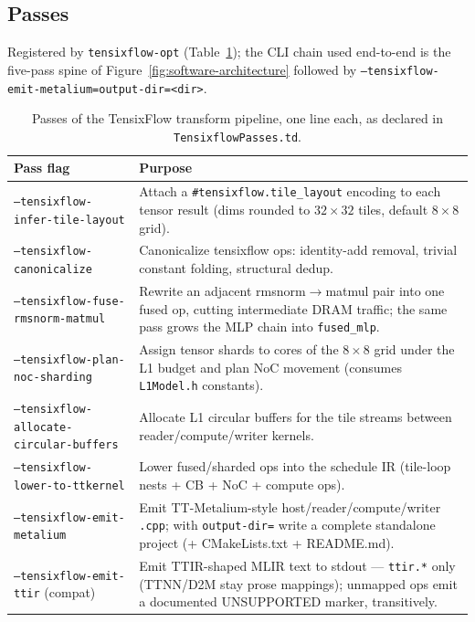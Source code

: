 \subsection{Passes}

Registered by \texttt{tensixflow-opt} (Table~\ref{tab:software-passes}); the
CLI chain used end-to-end is the five-pass spine of
Figure~\ref{fig:software-architecture} followed by
\texttt{--tensixflow-emit-metalium=output-dir=<dir>}.

\begin{table}[htbp]
  \centering
  \caption{Passes of the TensixFlow transform pipeline, one line each, as
  declared in \texttt{TensixflowPasses.td}.}
  \label{tab:software-passes}
  \small
  \begin{tabular}{@{}p{5.4cm}p{9.7cm}@{}}
    \toprule
    \textbf{Pass flag} & \textbf{Purpose} \\
    \midrule
    \texttt{--tensixflow-infer-tile-layout} & Attach a \texttt{\#tensixflow.tile\_layout} encoding to each tensor result (dims rounded to $32\times32$ tiles, default $8\times8$ grid). \\
    \texttt{--tensixflow-canonicalize} & Canonicalize tensixflow ops: identity-add removal, trivial constant folding, structural dedup. \\
    \texttt{--tensixflow-fuse-rmsnorm-matmul} & Rewrite an adjacent rmsnorm$\to$matmul pair into one fused op, cutting intermediate DRAM traffic; the same pass grows the MLP chain into \texttt{fused\_mlp}. \\
    \texttt{--tensixflow-plan-noc-sharding} & Assign tensor shards to cores of the $8\times8$ grid under the L1 budget and plan NoC movement (consumes \texttt{L1Model.h} constants). \\
    \texttt{--tensixflow-allocate-circular-buffers} & Allocate L1 circular buffers for the tile streams between reader/compute/writer kernels. \\
    \texttt{--tensixflow-lower-to-ttkernel} & Lower fused/sharded ops into the schedule IR (tile-loop nests + CB + NoC + compute ops). \\
    \texttt{--tensixflow-emit-metalium} & Emit TT-Metalium-style host/reader/compute/writer \texttt{.cpp}; with \texttt{output-dir=} write a complete standalone project (+ CMakeLists.txt + README.md). \\
    \texttt{--tensixflow-emit-ttir} (compat) & Emit TTIR-shaped MLIR text to stdout --- \texttt{ttir.*} only (TTNN/D2M stay prose mappings); unmapped ops emit a documented UNSUPPORTED marker, transitively. \\
    \bottomrule
  \end{tabular}
\end{table}

